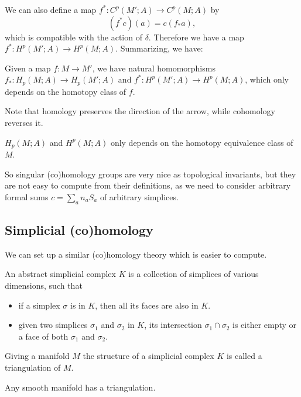 \documentclass[12pt]{article}
\numberwithin{equation}{section}
\theoremstyle{remark}
\begin{document}
We can also define a map $f^*:C^p(M';A)\to C^p(M;A)$ by \begin{equation}
(f^*c)(a) = c(f_*a),
\end{equation} which is compatible with the action of $\delta$.
Therefore we have a map $f^*: H^p(M';A)\to H^p(M;A)$.
Summarizing, we have:
\begin{proposition}
Given a map $f:M\to M'$, we have natural homomorphisms 
 $f_*: H_p(M;A)\to H_p(M';A)$ and $f^*: H^p(M';A)\to H^p(M;A)$,
 which only depends on the homotopy class of $f$.
\end{proposition}

Note that homology preserves the direction of the arrow, while cohomology reverses it.

\begin{corollary}
  $H_p(M;A)$ and $H^p(M;A)$ only depends on the homotopy equivalence class of $M$.
\end{corollary}

So singular (co)homology groups are very nice as topological invariants,
but they are not easy to compute from their definitions,
as we need to consider arbitrary formal sums $c=\sum_a n_a S_a$ of arbitrary simplices.

\subsection{Simplicial (co)homology}
We can set up a similar (co)homology theory which is easier to compute.

\begin{definition}
  \label{def:simplicial}
An abstract simplicial complex $K$ is a collection of simplices of various dimensions, such that \begin{itemize}
\item if a simplex $\sigma$ is in $K$, then all its faces are also in $K$.
\item given two simplices $\sigma_1$ and $\sigma_2$ in $K$, its intersection $\sigma_1\cap \sigma_2$ is either empty or a face of both $\sigma_1$ and $\sigma_2$. 
\end{itemize}
\end{definition}



\begin{definition}
Giving a manifold $M$ the structure of a simplicial complex $K$ is called a triangulation of $M$.
\end{definition}

\begin{proposition}
  Any smooth manifold has a triangulation.
\end{proposition}
\end{document}
